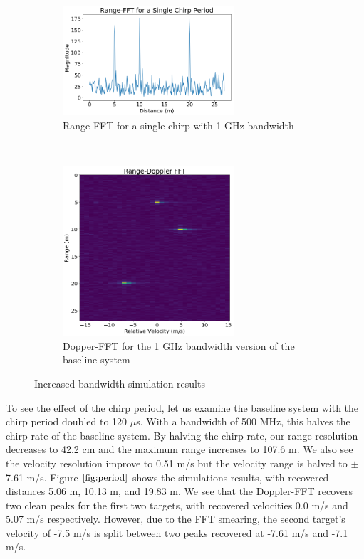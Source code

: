 \begin{figure}[h]
	\centering 
	\begin{subfigure}[c]{0.5\textwidth}
		\centering
		\includegraphics[width=2.5in]{imgs/bandwidth_range}
		\caption{Range-FFT for a single chirp with 1 GHz bandwidth}
	\end{subfigure}%
	~
	\begin{subfigure}[c]{0.5\textwidth}
		\centering
		\includegraphics[width=2.5in]{imgs/bandwidth_doppler}
		\caption{Dopper-FFT for the 1 GHz bandwidth version of the
		baseline system}
	\end{subfigure}
	\caption{Increased bandwidth simulation results}
	\label{fig:bandwidth}
\end{figure}

To see the effect of the chirp period, let us examine the baseline system with
the chirp period doubled to 120 $\mu$s. With a bandwidth of 500 MHz, this halves
the chirp rate of the baseline system. By halving the chirp rate, our range
resolution decreases to 42.2 cm and the maximum range increases to 107.6 m. We
also see the velocity resolution improve to 0.51 m/s but the velocity range is
halved to $\pm$7.61 m/s. Figure $\ref{fig:period}$ shows the simulations
results, with recovered distances 5.06 m, 10.13 m, and 19.83 m. We see that the
Doppler-FFT recovers two clean peaks for the first two targets, with recovered
velocities 0.0 m/s and 5.07 m/s respectively. However, due to the FFT smearing, the second target's
velocity of -7.5 m/s is split between two peaks recovered at -7.61 m/s and -7.1
m/s.

